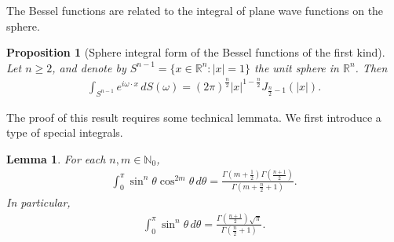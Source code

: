 \documentclass{article}
\numberwithin{equation}{section}
\newcommand{\bbN}{\mathbb{N}}
\newcommand{\bbR}{\mathbb{R}}
\theoremstyle{plain}
\newtheorem{lemma}[theorem]{Lemma}
\newtheorem{proposition}[theorem]{Proposition}
\theoremstyle{definition}
\begin{document}
The Bessel functions are related to the integral of plane wave functions on the sphere.
\begin{proposition}[Sphere integral form of the Bessel functions of the first kind]\label{besselintegral}
	Let $n\geq 2$, and denote by $S^{n-1}=\{x\in\bbR^n:\vert x\vert=1\}$ the unit sphere in $\bbR^n$. Then
	\begin{align}
		\int_{S^{n-1}}e^{i\omega\cdot x}\,dS(\omega)=(2\pi)^{\frac{n}{2}}\vert x\vert^{1-\frac{n}{2}}J_{\frac{n}{2}-1}(\vert x\vert).\label{integralbessel}
	\end{align}
\end{proposition}

The proof of this result requires some technical lemmata. We first introduce a type of special integrals.

\begin{lemma}\label{sinpowerintegral} For each $n,m\in\bbN_0$,
\begin{align*}
	\int_0^\pi\sin^n\theta\cos^{2m}\theta\,d\theta=\frac{\Gamma\left(m+\frac{1}{2}\right)\Gamma\left(\frac{n+1}{2}\right)}{\Gamma\left(m+\frac{n}{2}+1\right)}.
\end{align*}
In particular,
\begin{align*}
	\int_0^\pi\sin^n\theta\,d\theta=\frac{\Gamma\left(\frac{n+1}{2}\right)\sqrt{\pi}}{\Gamma\left(\frac{n}{2}+1\right)}.
\end{align*}
\end{lemma}
\end{document}

